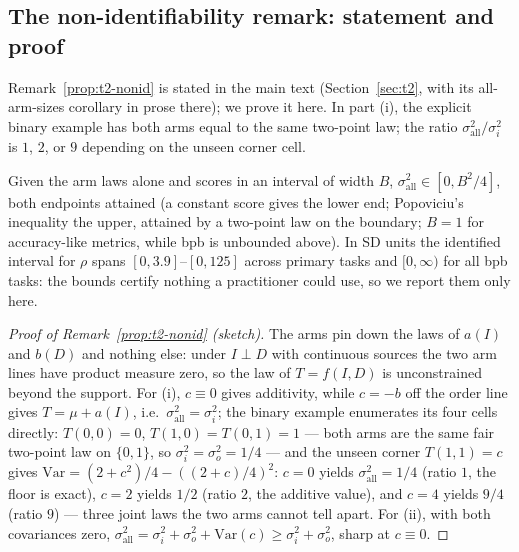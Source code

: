\subsection{The non-identifiability remark: statement and proof}
\label{app:t2-proof}

Remark~\ref{prop:t2-nonid} is stated in the main text
(Section~\ref{sec:t2}, with its all-arm-sizes corollary in prose there); we prove it here. In part (i), the explicit binary example has
both arms equal to the same two-point law; the ratio $\sigma_{\mathrm{all}}^2/\sigma_i^2$ is
$1$, $2$, or $9$ depending on the unseen corner cell.

\begin{remark}
Given the arm laws alone and scores in an interval of
width $B$, $\sigma_{\mathrm{all}}^2 \in [0, B^2/4]$, both endpoints attained (a constant score
gives the lower end; Popoviciu's inequality the upper, attained by a two-point law on the
boundary; $B{=}1$ for accuracy-like metrics, while bpb is unbounded above). In SD units the
identified interval for $\rho$ spans $[0, 3.9]$--$[0, 125]$ across primary tasks and
$[0, \infty)$ for all bpb tasks: the bounds certify nothing a practitioner could use, so we
report them only here.
\end{remark}

\begin{proof}[Proof of Remark~\ref{prop:t2-nonid} (sketch)]
The arms pin down the laws of $a(I)$ and $b(D)$ and nothing else: under $I \perp D$ with
continuous sources the two arm lines have product measure zero, so the law of
$T = f(I,D)$ is unconstrained beyond the support. For (i), $c \equiv 0$ gives additivity,
while $c = -b$ off the order line gives $T = \mu + a(I)$, i.e.\
$\sigma_{\mathrm{all}}^2 = \sigma_i^2$; the binary example enumerates its four cells
directly: $T(0,0) = 0$, $T(1,0) = T(0,1) = 1$ --- both arms are the same fair two-point law on
$\{0,1\}$, so $\sigma_i^2 = \sigma_o^2 = 1/4$ --- and the unseen corner $T(1,1) = c$ gives
$\mathrm{Var} = (2 + c^2)/4 - ((2 + c)/4)^2$: $c = 0$ yields $\sigma_{\mathrm{all}}^2 = 1/4$
(ratio $1$, the floor is exact), $c = 2$ yields $1/2$ (ratio $2$, the additive value), and
$c = 4$ yields $9/4$ (ratio $9$) --- three joint laws the two arms cannot tell apart. For (ii), with both covariances zero,
$\sigma_{\mathrm{all}}^2 = \sigma_i^2 + \sigma_o^2 + \mathrm{Var}(c) \ge
\sigma_i^2 + \sigma_o^2$, sharp at $c \equiv 0$.
\end{proof}

